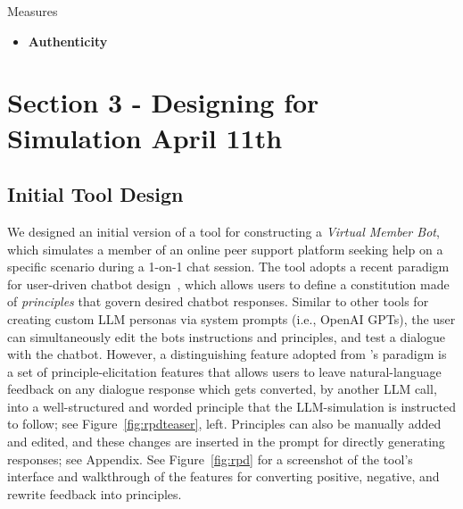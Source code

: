 Measures
\begin{itemize}
    \item \textbf{Authenticity}
\end{itemize}


\section{Section 3 - Designing for Simulation April 11th }

\subsection{Initial Tool Design}
We designed an initial version of a tool for constructing a \emph{Virtual Member Bot}, which simulates a member of an online peer support platform seeking help on a specific scenario during a 1-on-1 chat session. The tool adopts a recent paradigm for user-driven chatbot design~\cite{petridis2023constitutionmaker}, which allows users to define a constitution made of {\em principles} that govern desired chatbot responses. Similar to other tools for creating custom LLM personas via system prompts (i.e., OpenAI GPTs), the user can simultaneously edit the bots instructions and principles, and test a dialogue with the chatbot. However, a distinguishing feature adopted from \citet{petridis2023constitutionmaker}'s paradigm is a set of principle-elicitation features that allows users to leave natural-language feedback on any dialogue response which gets converted, by another LLM call, into a well-structured and worded principle that the LLM-simulation is instructed to follow; see Figure~\ref{fig:rpdteaser}, left. Principles can also be manually added and edited, and these changes are inserted in the prompt for directly generating responses; see Appendix. See Figure~\ref{fig:rpd} for a screenshot of the tool's interface and walkthrough of the features for converting positive, negative, and rewrite feedback into principles.


